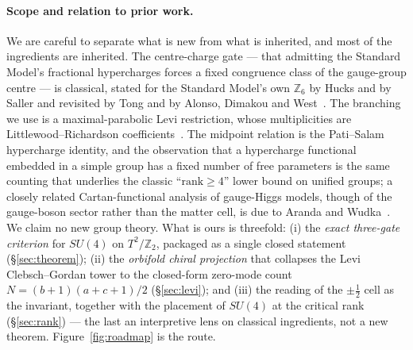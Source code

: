 \documentclass[11pt,a4paper]{article}
\newcommand{\ZZ}{\mathbb{Z}}
\begin{document}
\paragraph{Scope and relation to prior work.} We are careful to separate what is new from
what is inherited, and most of the ingredients are inherited. The centre-charge gate ---
that admitting the Standard Model's fractional hypercharges forces a fixed congruence class
of the gauge-group centre --- is classical, stated for the Standard Model's own $\ZZ_6$ by
Hucks and by Saller and revisited by Tong and by Alonso, Dimakou and
West~\cite{Hucks,Saller,Tong,Alonso}. The branching we use is a maximal-parabolic Levi
restriction, whose multiplicities are Littlewood--Richardson coefficients~\cite{Fulton,GW}.
The midpoint relation is the Pati--Salam hypercharge identity, and the observation that a
hypercharge functional embedded in a simple group has a fixed number of free parameters is
the same counting that underlies the classic ``$\mathrm{rank}\ge 4$'' lower bound on
unified groups; a closely related Cartan-functional analysis of gauge-Higgs models, though
of the gauge-boson sector rather than the matter cell, is due to Aranda and
Wudka~\cite{ArandaWudka}. We claim no new group theory. What is ours is threefold:
(i) the \emph{exact three-gate criterion} for $SU(4)$ on $T^2/\mathbb{Z}_2$, packaged as a
single closed statement (\S\ref{sec:theorem}); (ii) the \emph{orbifold chiral projection}
that collapses the Levi Clebsch--Gordan tower to the closed-form zero-mode count
$N=(b+1)(a+c+1)/2$ (\S\ref{sec:levi}); and (iii) the reading of the $\pm\tfrac12$ cell as
the invariant, together with the placement of $SU(4)$ at the critical rank
(\S\ref{sec:rank}) --- the last an interpretive lens on classical ingredients, not a new
theorem. Figure~\ref{fig:roadmap} is the route.
\end{document}

